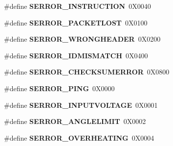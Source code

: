 \begin{DoxyCompactItemize}
\item 
\#define {\bfseries S\+E\+R\+R\+O\+R\+\_\+\+I\+N\+S\+T\+R\+U\+C\+T\+I\+ON}~0\+X0040\hypertarget{group__SERROR__GROUP_ga700b18e096ad99114131499058311fbf}{}\label{group__SERROR__GROUP_ga700b18e096ad99114131499058311fbf}

\item 
\#define {\bfseries S\+E\+R\+R\+O\+R\+\_\+\+P\+A\+C\+K\+E\+T\+L\+O\+ST}~0\+X0100\hypertarget{group__SERROR__GROUP_ga44f9f0354cf660b3e0af565d8358aa5d}{}\label{group__SERROR__GROUP_ga44f9f0354cf660b3e0af565d8358aa5d}

\item 
\#define {\bfseries S\+E\+R\+R\+O\+R\+\_\+\+W\+R\+O\+N\+G\+H\+E\+A\+D\+ER}~0\+X0200\hypertarget{group__SERROR__GROUP_ga2453d13a9841c9589382458b494571b6}{}\label{group__SERROR__GROUP_ga2453d13a9841c9589382458b494571b6}

\item 
\#define {\bfseries S\+E\+R\+R\+O\+R\+\_\+\+I\+D\+M\+I\+S\+M\+A\+T\+CH}~0\+X0400\hypertarget{group__SERROR__GROUP_ga08115676708915dd4be9d0cad1923c5d}{}\label{group__SERROR__GROUP_ga08115676708915dd4be9d0cad1923c5d}

\item 
\#define {\bfseries S\+E\+R\+R\+O\+R\+\_\+\+C\+H\+E\+C\+K\+S\+U\+M\+E\+R\+R\+OR}~0\+X0800\hypertarget{group__SERROR__GROUP_ga82069719a95b7b7dadf7a5590c35fdc4}{}\label{group__SERROR__GROUP_ga82069719a95b7b7dadf7a5590c35fdc4}

\item 
\#define {\bfseries S\+E\+R\+R\+O\+R\+\_\+\+P\+I\+NG}~0\+X0000\hypertarget{group__SERROR__GROUP_ga5a8520cf5e5994922ae52c5d2ee00ae8}{}\label{group__SERROR__GROUP_ga5a8520cf5e5994922ae52c5d2ee00ae8}

\item 
\#define {\bfseries S\+E\+R\+R\+O\+R\+\_\+\+I\+N\+P\+U\+T\+V\+O\+L\+T\+A\+GE}~0\+X0001\hypertarget{group__SERROR__GROUP_gadff4cfa680e4cd5d08561f5683a011e7}{}\label{group__SERROR__GROUP_gadff4cfa680e4cd5d08561f5683a011e7}

\item 
\#define {\bfseries S\+E\+R\+R\+O\+R\+\_\+\+A\+N\+G\+L\+E\+L\+I\+M\+IT}~0\+X0002\hypertarget{group__SERROR__GROUP_gad88c90b26053a3eed1f2517aea5368ef}{}\label{group__SERROR__GROUP_gad88c90b26053a3eed1f2517aea5368ef}

\item 
\#define {\bfseries S\+E\+R\+R\+O\+R\+\_\+\+O\+V\+E\+R\+H\+E\+A\+T\+I\+NG}~0\+X0004\hypertarget{group__SERROR__GROUP_ga00ae45eb6f3fc38d304adff95af9f5b3}{}\label{group__SERROR__GROUP_ga00ae45eb6f3fc38d304adff95af9f5b3}


\end{DoxyCompactItemize}
